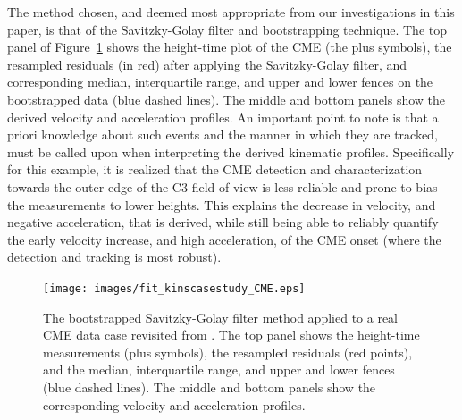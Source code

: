 \documentclass[structabstract]{aa}
\begin{document}
The method chosen, and deemed most appropriate from our investigations in this paper, is that of the Savitzky-Golay filter and bootstrapping technique. The top panel of Figure~\ref{fig_savgol_CME} shows the height-time plot of the CME (the plus symbols), the resampled residuals (in red) after applying the Savitzky-Golay filter, and corresponding median, interquartile range, and upper and lower fences on the bootstrapped data (blue dashed lines). The middle and bottom panels show the derived velocity and acceleration profiles. An important point to note is that a priori knowledge about such events and the manner in which they are tracked, must be called upon when interpreting the derived kinematic profiles. Specifically for this example, it is realized that the CME detection and characterization towards the outer edge of the C3 field-of-view is less reliable and prone to bias the measurements to lower heights. This explains the decrease in velocity, and negative acceleration, that is derived, while still being able to reliably quantify the early velocity increase, and high acceleration, of the CME onset (where the detection and tracking is most robust). 


\begin{figure}
\centering
\texttt{[image: images/fit\_kinscasestudy\_CME.eps]}
\caption{The bootstrapped Savitzky-Golay filter method applied to a real CME data case revisited from \citealt{2009A&A...495..325B}. The top panel shows the height-time measurements (plus symbols), the resampled residuals (red points), and the median, interquartile range, and upper and lower fences (blue dashed lines). The middle and bottom panels show the corresponding velocity and acceleration profiles.}
\label{fig_savgol_CME}
\end{figure}
\end{document}
